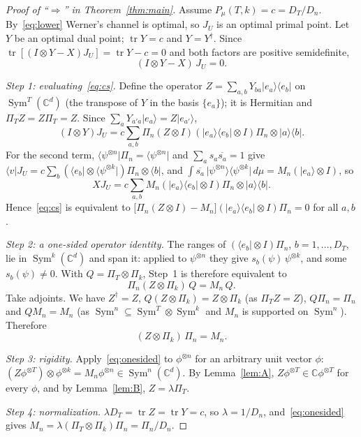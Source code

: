 \documentclass[11pt]{article}
\newcommand{\C}{\mathbb{C}}
\newcommand{\tr}{\operatorname{tr}}
\newcommand{\Sym}{\operatorname{Sym}}
\newcommand{\ket}[1]{\lvert #1\rangle}
\newcommand{\bra}[1]{\langle #1\rvert}
\theoremstyle{definition}
\theoremstyle{remark}
\begin{document}
\begin{proof}[Proof of ``$\Rightarrow$'' in Theorem~\ref{thm:main}]
Assume $P_\mu(T,k)=c=D_T/D_n$. By~\eqref{eq:lower} Werner's channel is optimal, so $J_U$ is an optimal primal point.
Let $Y$ be an optimal dual point; $\tr Y=c$ and $Y=Y^\dagger$. Since $\tr[(I\otimes Y-X)J_U]=\tr Y-c=0$ and both
factors are positive semidefinite,
\begin{equation}\label{eq:cs}
(I\otimes Y-X)\,J_U=0 .
\end{equation}

\emph{Step 1: evaluating~\eqref{eq:cs}.} Define the operator $Z=\sum_{a,b}Y_{ba}\ket{e_a}\!\bra{e_b}$ on $\Sym^T(\C^d)$
(the transpose of $Y$ in the basis $\{e_a\}$); it is Hermitian and $\Pi_TZ=Z\Pi_T=Z$. Since
$\sum_aY_{a'a}\ket{e_a}=Z\ket{e_{a'}}$,
\[
(I\otimes Y)J_U=c\sum_{a,b}\Pi_n(Z\otimes I)(\ket{e_a}\!\bra{e_b}\otimes I)\Pi_n\otimes\ket a\!\bra b .
\]
For the second term, $\bra{\psi^{\otimes n}}\Pi_n=\bra{\psi^{\otimes n}}$ and $\sum_a s_a\overline{s_a}=1$ give
$\bra vJ_U=c\sum_b(\bra{e_b}\otimes\bra{\psi^{\otimes k}})\Pi_n\otimes\bra b$, and
$\int\overline{s_a}\,\ket{\psi^{\otimes n}}\bra{\psi^{\otimes k}}\,d\mu=M_n(\ket{e_a}\otimes I)$, so
\[
XJ_U=c\sum_{a,b}M_n(\ket{e_a}\!\bra{e_b}\otimes I)\Pi_n\otimes\ket a\!\bra b .
\]
Hence~\eqref{eq:cs} is equivalent to
$\big[\Pi_n(Z\otimes I)-M_n\big](\ket{e_a}\!\bra{e_b}\otimes I)\Pi_n=0$ for all $a,b$.

\emph{Step 2: a one-sided operator identity.} The ranges of $(\bra{e_b}\otimes I)\Pi_n$, $b=1,\dots,D_T$, lie in
$\Sym^k(\C^d)$ and span it: applied to $\psi^{\otimes n}$ they give $s_b(\psi)\,\psi^{\otimes k}$, and some
$s_b(\psi)\ne0$. With $Q=\Pi_T\otimes\Pi_k$, Step~1 is therefore equivalent to
\[
\Pi_n(Z\otimes\Pi_k)\,Q=M_n\,Q .
\]
Take adjoints. We have $Z^\dagger=Z$, $Q(Z\otimes\Pi_k)=Z\otimes\Pi_k$ (as $\Pi_TZ=Z$), $Q\Pi_n=\Pi_n$ and
$QM_n=M_n$ (as $\Sym^n\subseteq\Sym^T\otimes\Sym^k$ and $M_n$ is supported on $\Sym^n$). Therefore
\begin{equation}\label{eq:onesided}
(Z\otimes\Pi_k)\,\Pi_n=M_n .
\end{equation}

\emph{Step 3: rigidity.} Apply~\eqref{eq:onesided} to $\phi^{\otimes n}$ for an arbitrary unit vector $\phi$:
$(Z\phi^{\otimes T})\otimes\phi^{\otimes k}=M_n\phi^{\otimes n}\in\Sym^n(\C^d)$. By Lemma~\ref{lem:A},
$Z\phi^{\otimes T}\in\C\phi^{\otimes T}$ for every $\phi$, and by Lemma~\ref{lem:B}, $Z=\lambda\Pi_T$.

\emph{Step 4: normalization.} $\lambda D_T=\tr Z=\tr Y=c$, so $\lambda=1/D_n$, and~\eqref{eq:onesided} gives
$M_n=\lambda(\Pi_T\otimes\Pi_k)\Pi_n=\Pi_n/D_n$.
\end{proof}
\end{document}
